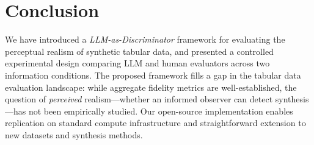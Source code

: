 \documentclass[runningheads]{llncs}
\begin{document}
\section{Conclusion}
\label{sec:conclusion}

We have introduced a \emph{LLM-as-Discriminator} framework for
evaluating the perceptual realism of synthetic tabular data, and
presented a controlled experimental design comparing LLM and human
evaluators across two information conditions.
The proposed framework fills a gap in the tabular data evaluation
landscape: while aggregate fidelity metrics are well-established,
the question of \emph{perceived} realism---whether an informed observer
can detect synthesis---has not been empirically studied.
Our open-source implementation enables replication on standard compute
infrastructure and straightforward extension to new datasets and
synthesis methods.



\end{document}

